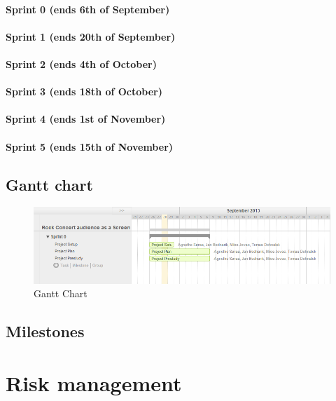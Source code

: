 \documentclass{article}
\begin{document}
\paragraph{Sprint 0 (ends 6th of September)}
\paragraph{Sprint 1 (ends 20th of September)}
\paragraph{Sprint 2 (ends 4th of October)}
\paragraph{Sprint 3 (ends 18th of October)}
\paragraph{Sprint 4 (ends 1st of November)}
\paragraph{Sprint 5 (ends 15th of November)}
\subsection{Gantt chart}

\begin{figure}[ht]
\begin{center}
    \includegraphics[scale=0.6]{images/gantt}
    \caption{Gantt Chart}
    \label{img:gantt}
\end{center}
\end{figure}

\subsection{Milestones}
\section{Risk management}
\end{document}
